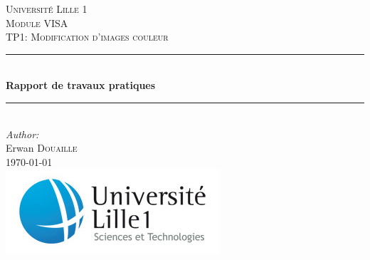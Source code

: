 \makeatletter

\begin{titlepage}

\newcommand{\HRule}{\rule{\linewidth}{0.5mm}} %

\center %
 

\textsc{\LARGE Université Lille 1}\\[1.5cm] %
\vspace{7em}
\textsc{\Large Module VISA}\\[0.5cm] %
\textsc{\large TP1: Modification d'images couleur }\\[0.5cm] %


\vspace{1em}
\HRule \\[0.4cm]
{ \huge \bfseries Rapport de travaux pratiques}\\[0.1cm] %
\HRule \\[2cm]
 

\Large \emph{Author:}\\
Erwan \textsc{Douaille}\\[1cm] %


{\large \today}\\[3cm] %


\includegraphics[scale=0.6]{image/ustl1.jpg}
 

\vfill %

\end{titlepage}
\makeatother

\sloppy